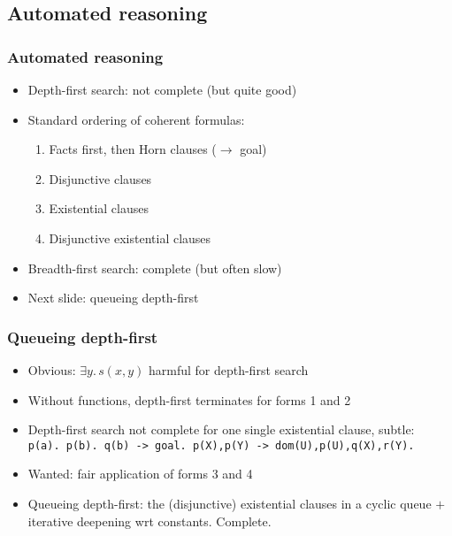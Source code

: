 \documentclass[handout,11pt]{beamer}
\newcommand{\weg}[1]{}
\begin{document}
\subsection{Automated reasoning}

\weg{
\begin{frame}
\frametitle{Example: DP closed under reflexive closure}
\small
\end{frame}

\frame
  {    
    \frametitle{Search space} \vspace*{-.95in}
    \scalebox{0.40}
      {
    \texttt{[image: tree\_dpe]}
      }
  }
}%

\begin{frame}
\frametitle{Automated reasoning}
 \begin{itemize}[<+->]   %
    \item Depth-first search: not complete (but quite good)
    \item Standard ordering of coherent formulas:
    \begin{enumerate}
       \item Facts first, then Horn clauses ($\to$ goal)
       \item Disjunctive clauses
       \item Existential clauses
       \item Disjunctive existential clauses
    \end{enumerate}
    \item Breadth-first search: complete (but often slow)
    \item Next slide: queueing depth-first
 \end{itemize}
\end{frame}

\begin{frame}
\frametitle{Queueing depth-first}
 \begin{itemize}[<+->]
    \item Obvious: $\exists y.\,s(x,y)$ harmful for depth-first search
    \item Without functions, depth-first terminates for forms 1 and 2
    \item Depth-first search not complete for \alert{one single existential} clause, subtle:
\texttt{  p(a). p(b). q(b) -> goal. p(X),p(Y) -> dom(U),p(U),q(X),r(Y).}
    \item Wanted: fair application of forms 3 and 4 
    \item Queueing depth-first: the (disjunctive) existential clauses
          in a cyclic queue $+$ iterative deepening wrt constants. Complete.
 \end{itemize}
\end{frame}
\end{document}
